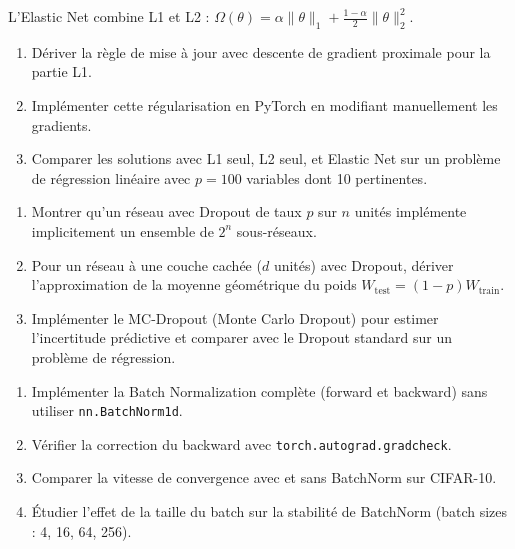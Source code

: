 \begin{exercice}
L'Elastic Net combine L1 et L2 :
$\Omega(\theta) = \alpha \|\theta\|_1 + \frac{1-\alpha}{2}\|\theta\|_2^2$.
\begin{enumerate}
  \item D\'eriver la r\`egle de mise \`a jour avec descente de gradient
    proximale pour la partie L1.
  \item Impl\'ementer cette r\'egularisation en PyTorch en modifiant
    manuellement les gradients.
  \item Comparer les solutions avec L1 seul, L2 seul, et Elastic Net sur un
    probl\`eme de r\'egression lin\'eaire avec $p = 100$ variables dont 10
    pertinentes.
\end{enumerate}
\end{exercice}

\begin{exercice}
\begin{enumerate}
  \item Montrer qu'un r\'eseau avec Dropout de taux $p$ sur $n$ unit\'es
    impl\'emente implicitement un ensemble de $2^n$ sous-r\'eseaux.
  \item Pour un r\'eseau \`a une couche cach\'ee ($d$ unit\'es) avec Dropout,
    d\'eriver l'approximation de la moyenne g\'eom\'etrique du poids
    $W_{\text{test}} = (1-p) W_{\text{train}}$.
  \item Impl\'ementer le MC-Dropout (Monte Carlo Dropout) pour estimer
    l'incertitude pr\'edictive et comparer avec le Dropout standard sur
    un probl\`eme de r\'egression.
\end{enumerate}
\end{exercice}

\begin{exercice}
\begin{enumerate}
  \item Impl\'ementer la Batch Normalization compl\`ete (forward et backward)
    sans utiliser \texttt{nn.BatchNorm1d}.
  \item V\'erifier la correction du backward avec \texttt{torch.autograd.gradcheck}.
  \item Comparer la vitesse de convergence avec et sans BatchNorm sur CIFAR-10.
  \item \'Etudier l'effet de la taille du batch sur la stabilit\'e de BatchNorm
    (batch sizes : 4, 16, 64, 256).
\end{enumerate}
\end{exercice}

